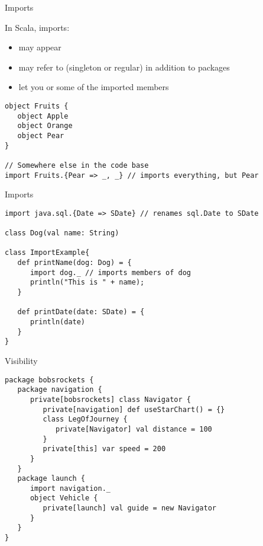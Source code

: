 \begin{frame}[fragile]{Imports}
\begin{block}{In Scala, imports:}
\begin{itemize}
  \item may appear 
  \item may refer to  (singleton or regular) in addition to
  packages
  \item let you  or  some of the imported
  members
\end{itemize}
\end{block}
\pause
\begin{lstlisting}
object Fruits {
   object Apple
   object Orange
   object Pear
}

// Somewhere else in the code base
import Fruits.{Pear => _, _} // imports everything, but Pear
\end{lstlisting}
\end{frame}

\begin{frame}[fragile]{Imports}
\begin{lstlisting}
import java.sql.{Date => SDate} // renames sql.Date to SDate

class Dog(val name: String)

class ImportExample{
   def printName(dog: Dog) = {
      import dog._ // imports members of dog
      println("This is " + name);
   }
   
   def printDate(date: SDate) = {
      println(date)
   }
}
\end{lstlisting}
\end{frame}

\begin{frame}[fragile]{Visibility}
\begin{lstlisting}
package bobsrockets {
   package navigation {
      private[bobsrockets] class Navigator {
         private[navigation] def useStarChart() = {}
         class LegOfJourney {
            private[Navigator] val distance = 100
         }
         private[this] var speed = 200
      }
   }
   package launch {
      import navigation._
      object Vehicle {
         private[launch] val guide = new Navigator
      }
   }
}
\end{lstlisting}
\end{frame}

